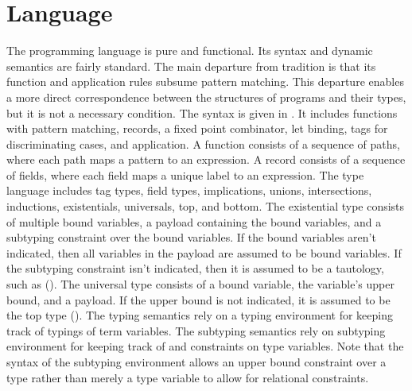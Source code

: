 \documentclass[acmsmall]{acmart}
\theoremstyle{definition}
\begin{document}
\section{Language}
The programming language is pure and functional. Its syntax and dynamic semantics 
are fairly standard. The main departure from tradition is that its function
and application rules subsume pattern matching. This departure enables a more direct  
correspondence between the structures of programs and their types, but it is 
not a necessary condition.
The syntax is given in .
It includes functions with pattern matching, records, a fixed point combinator, let binding, 
tags for discriminating cases, and application.
A function consists of a sequence of paths, where each path maps a pattern to an expression.
A record consists of a sequence of fields, where each field maps a unique label to an expression. 
The type language includes tag types, field types, implications, unions, intersections, 
inductions, existentials, universals, top, and bottom. 
The existential type consists of multiple bound variables, a payload containing the bound variables, 
and a subtyping constraint over the bound variables. 
If the bound variables aren't indicated, then all variables in the payload are
assumed to be bound variables. If the subtyping constraint isn't indicated, then it is assumed to 
be a tautology, such as ().
The universal type consists of a bound variable, the variable's upper bound, and a payload. If the upper
bound is not indicated, it is assumed to be the top type ().
The typing semantics rely on a typing environment for keeping track of typings of term variables.
The subtyping semantics rely on subtyping environment for keeping track of and constraints on type variables. 
Note that the syntax of the subtyping environment allows an upper bound constraint over a type
rather than merely a type variable to allow for relational constraints. 



\end{document}
